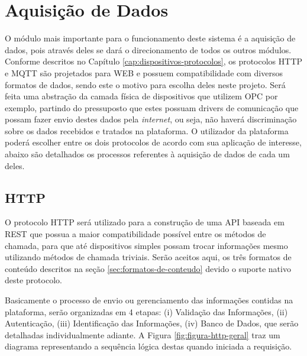 \section{Aquisição de Dados}
\label{sec:aquisicao-dados}
O módulo mais importante para o funcionamento deste sistema é a aquisição de dados, pois através deles se dará o direcionamento de todos os outros módulos. Conforme descritos no Capítulo \ref{cap:dispositivos-protocolos}, os protocolos \gls{HTTP} e \gls{MQTT} são  projetados para \gls{WEB} e possuem compatibilidade com diversos formatos de dados, sendo este o motivo para escolha deles neste projeto. Será feita uma abstração da camada física de dispositivos que utilizem \gls{OPC} por exemplo, partindo do pressuposto que estes possuam drivers de comunicação que possam fazer envio destes dados pela \textit{internet}, ou seja, não haverá discriminação sobre os dados recebidos e tratados na plataforma. O utilizador da plataforma poderá escolher entre os dois protocolos de acordo com sua aplicação de interesse, abaixo são detalhados os processos referentes à aquisição de dados de cada um deles.

        \subsection{HTTP}
        \label{sec:aquisicao-http}
        O protocolo \gls{HTTP} será utilizado para a construção de uma \gls{API} baseada em \gls{REST} que possua a maior compatibilidade possível entre os métodos de chamada, para que até dispositivos simples possam trocar informações mesmo utilizando métodos de chamada triviais. Serão aceitos aqui, os três formatos de conteúdo descritos na seção \ref{sec:formatos-de-conteudo} devido o suporte nativo deste protocolo.
        
        Basicamente o processo de envio ou gerenciamento das informações contidas na plataforma, serão organizadas em 4 etapas: (i) Validação das Informações, (ii) Autenticação, (iii) Identificação das Informações, (iv) Banco de Dados, que serão detalhadas individualmente adiante. A Figura \ref{fig:figura-http-geral} traz um diagrama representando a sequência lógica destas quando iniciada a requisição.
        
